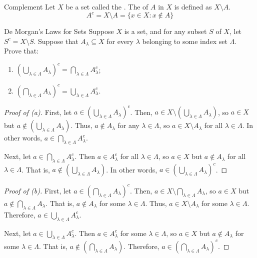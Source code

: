 \begin{dfnbox}{Complement}{}
    Let $X$ be a set called the . The  of $A$ in $X$ is defined as $X \setminus A$.
    \tcblower
    \[ A^c = X \setminus A = \{ x \in X : x \notin A \} \]
\end{dfnbox}

\begin{thmbox}{De Morgan's Laws for Sets}{}
    Suppose $X$ is a set, and for any subset $S$ of $X$, let $S^c = X \setminus S$. Suppose that $A_\lambda \subseteq X$ for every $\lambda$ belonging to some index set $\Lambda$. Prove that:
    \begin{enumerate}[label=(\alph*)]
        \item \( \left( \bigcup_{\lambda \in \Lambda} A_\lambda \right)^c = \bigcap_{\lambda \in \Lambda} A_\lambda^c \);
        \item \( \left( \bigcap_{\lambda \in \Lambda} A_\lambda \right)^c = \bigcup_{\lambda \in \Lambda}A_\lambda^c \).
    \end{enumerate}
    \tcblower
    \begin{proof}[Proof of (a)]
        First, let $a \in \left( \bigcup_{\lambda \in \Lambda} A_\lambda \right)^c$. Then, $a \in X \setminus \left( \bigcup_{\lambda \in \Lambda} A_\lambda \right)$, so $a \in X$ but $a \notin \left( \bigcup_{\lambda \in \Lambda} A_\lambda \right)$. Thus, $a \notin A_\lambda$ for any $\lambda \in \Lambda$, so $a \in X \setminus A_\lambda$ for all $\lambda \in \Lambda$. In other words, $a \in \bigcap_{\lambda \in \Lambda} A_\lambda^c$.

        Next, let $a \in \bigcap_{\lambda \in \Lambda} A_\lambda^c$. Then $a \in A_\lambda^c$ for all $\lambda \in \Lambda$, so $a \in X$ but $a \notin A_\lambda$ for all $\lambda \in \Lambda$. That is, $a \notin \left( \bigcup_{\lambda\in\Lambda} A_\lambda \right)$. In other words, $a \in \left( \bigcup_{\lambda\in\Lambda} A_\lambda \right) ^ c$.
    \end{proof}

    \begin{proof}[Proof of (b)]
        First, let $a \in \left( \bigcap_{\lambda \in \Lambda} A_\lambda \right)^c$. Then, $a \in X \setminus  \bigcap_{\lambda \in \Lambda} A_\lambda$, so $a \in X$ but $a \notin \bigcap_{\lambda \in \Lambda} A_\lambda$. That is, $a \notin A_\lambda$ for some $\lambda \in \Lambda$. Thus, $a \in X \setminus A_\lambda$ for some $\lambda \in \Lambda$. Therefore, $a \in \bigcup_{\lambda \in \Lambda} A_\lambda^c$.

        Next, let $a \in \bigcup_{\lambda \in \Lambda} A_\lambda^c$. Then $a \in A_\lambda^c$ for some $\lambda \in \Lambda$, so $a \in X$ but $a \notin A_\lambda$ for some $\lambda \in \Lambda$. That is, $a \notin \left( \bigcap_{\lambda \in \Lambda} A_\lambda \right)$. Therefore, $a \in  \left( \bigcap_{\lambda \in \Lambda} A_\lambda \right)^c$.
    \end{proof}
\end{thmbox}

